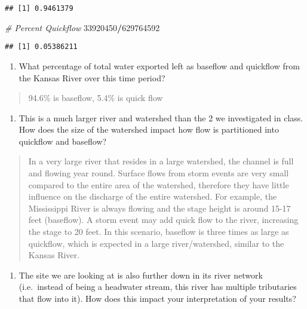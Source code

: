 \documentclass[]{article}
\newenvironment{Shaded}{\begin{snugshade}}{\end{snugshade}}
\newcommand{\CommentTok}[1]{\textcolor[rgb]{0.56,0.35,0.01}{\textit{#1}}}
\newcommand{\DecValTok}[1]{\textcolor[rgb]{0.00,0.00,0.81}{#1}}
\newcommand{\OperatorTok}[1]{\textcolor[rgb]{0.81,0.36,0.00}{\textbf{#1}}}
\providecommand{\tightlist}{%
  \setlength{\itemsep}{0pt}\setlength{\parskip}{0pt}}
\begin{document}
\begin{verbatim}
## [1] 0.9461379
\end{verbatim}

\begin{Shaded}
\begin{Highlighting}[]
\CommentTok{# Percent Quickflow}
\DecValTok{33920450}\OperatorTok{/}\DecValTok{629764592}
\end{Highlighting}
\end{Shaded}

\begin{verbatim}
## [1] 0.05386211
\end{verbatim}

\begin{enumerate}
\def\labelenumi{\arabic{enumi}.}
\setcounter{enumi}{10}
\tightlist
\item
  What percentage of total water exported left as baseflow and quickflow
  from the Kansas River over this time period?
\end{enumerate}

\begin{quote}
94.6\% is baseflow, 5.4\% is quick flow
\end{quote}

\begin{enumerate}
\def\labelenumi{\arabic{enumi}.}
\setcounter{enumi}{11}
\tightlist
\item
  This is a much larger river and watershed than the 2 we investigated
  in class. How does the size of the watershed impact how flow is
  partitioned into quickflow and baseflow?
\end{enumerate}

\begin{quote}
In a very large river that resides in a large watershed, the channel is
full and flowing year round. Surface flows from storm events are very
small compared to the entire area of the watershed, therefore they have
little influence on the discharge of the entire watershed. For example,
the Mississippi River is always flowing and the stage height is around
15-17 feet (baseflow). A storm event may add quick flow to the river,
increasing the stage to 20 feet. In this scenario, baseflow is three
times as large as quickflow, which is expected in a large
river/watershed, similar to the Kansas River.
\end{quote}

\begin{enumerate}
\def\labelenumi{\arabic{enumi}.}
\setcounter{enumi}{12}
\tightlist
\item
  The site we are looking at is also further down in its river network
  (i.e.~instead of being a headwater stream, this river has multiple
  tributaries that flow into it). How does this impact your
  interpretation of your results?
\end{enumerate}
\end{document}
